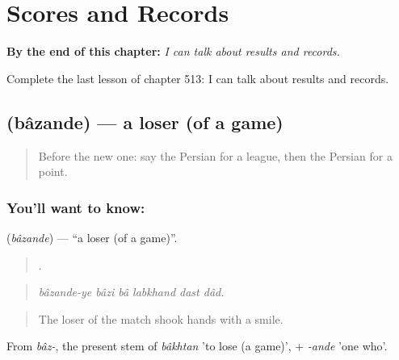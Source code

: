 
\chapter{Scores and Records}
\label{ch:fa-scores-and-records}

\begin{chapteropening}
\textbf{By the end of this chapter:} \emph{I can talk about results and records.}

Complete the last lesson of chapter 513: I can talk about results and records.
\end{chapteropening}

\section[\texorpdfstring{\fa{بازنده} (bâzande)}{بازنده (bâzande)}]{ (bâzande) — a loser (of a game)}

\label{lesson:FA-C513-bazande}



\begin{quote}
Before the new one: say the Persian for a league, then the Persian for a point.
\end{quote}

\subsection*{You'll want to know: }
\textbf{} (\emph{bâzande}) — \textquotedblleft{}a loser (of a game)\textquotedblright{}.

\begin{quote}
     .
\end{quote}

\begin{quote}
\emph{bâzande-ye bâzi bâ labkhand dast dâd.}
\end{quote}

\begin{quote}
The loser of the match shook hands with a smile.
\end{quote}

From \emph{bâz-}, the present stem of \emph{bâkhtan} 'to lose (a game)', + \emph{-ande} 'one who'.

